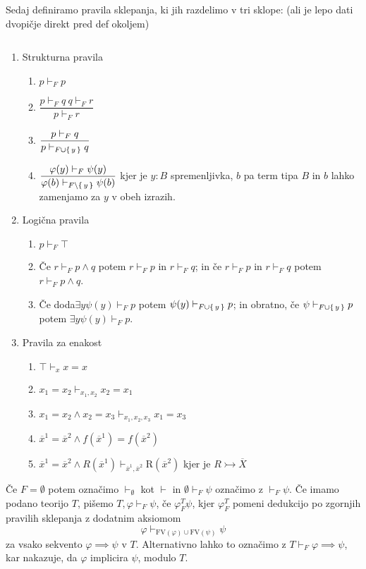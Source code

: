 Sedaj definiramo pravila sklepanja, ki jih razdelimo v tri sklope: (ali je lepo dati dvopičje direkt pred def okoljem)
\begin{definicija}
  $ $
  \begin{enumerate}[label*=\arabic*.]
    \item Strukturna pravila
    \begin{enumerate}[label*=\arabic*.]
      \item $p \vdash_F p$
      \item $\dfrac{p \vdash_F q \ q \vdash_F r}{p \vdash_F r}$
      \item $\dfrac{p \vdash_F q}{p \vdash_{F \cup \{\,y\,\}} q}$
      \item $\dfrac{\varphi(y) \vdash_F \psi(y)}{\varphi(b) \vdash_{F\setminus\{\,y\,\}} \psi(b)}$
      kjer je $y : B$ spremenljivka, $b$ pa term tipa $B$ in $b$ lahko zamenjamo za $y$ v obeh izrazih.
    \end{enumerate}
    \item Logična pravila
    \begin{enumerate}[label*=\arabic*.]
      \item $p \vdash_F \top$
      \item Če $r \vdash_F p \wedge q$ potem $r \vdash_F p$ in $r \vdash_F q$; in če $r \vdash_F p$ in $r \vdash_F q$ potem $r \vdash_F p \wedge q$.
      \item Če doda$\exists y \psi(y) \vdash_F p$ potem $\psi(y) \vdash_{F \cup \{\,y\,\}} p$; in obratno, če $\psi \vdash_{F \cup \{\,y\,\}} p$ potem $\exists y \psi(y) \vdash_F p$.
    \end{enumerate}
    \item Pravila za enakost
    \begin{enumerate}[label*=\arabic*.]
      \item $\top \vdash_x x = x$
      \item $x_1 = x_2 \vdash_{x_1, x_2} x_2 = x_1$
      \item $x_1 = x_2 \wedge x_2 = x_3 \vdash_{x_1, x_2, x_3} x_1 = x_3$
      \item $\overline{x}^1 = \overline{x}^2 \wedge f(\overline{x}^1) = f(\overline{x}^2)$
      \item $\overline{x}^1 = \overline{x}^2 \wedge R(\overline{x}^1) \vdash_{\overline{x}^1, \overline{x}^2} \mathrm{R}(\overline{x}^2)$
      kjer je $R \rightarrowtail \overline{X}$
    \end{enumerate}
  \end{enumerate}
  Če $F = \emptyset$ potem označimo $\vdash_\emptyset$ kot $\vdash$ in $\emptyset \vdash_F \psi$ označimo z $\vdash_F \psi$.
  Če imamo podano teorijo $T$, pišemo $T, \varphi \vdash_F \psi$, če $\varphi_F^T \psi$, kjer $\varphi_F^T$ pomeni dedukcijo po zgornjih pravilih sklepanja z dodatnim aksiomom
  $$\varphi \vdash_{\mathrm{FV}(\varphi) \cup \mathrm{FV}(\psi)} \psi$$
  za vsako sekvento $\varphi \implies \psi$ v $T$. Alternativno lahko to označimo z $T \vdash_F \varphi \implies \psi$, kar nakazuje, da $\varphi$ implicira $\psi$, modulo $T$.
\end{definicija}
\begin{primer}[izpeljava]
  
\end{primer}
%

